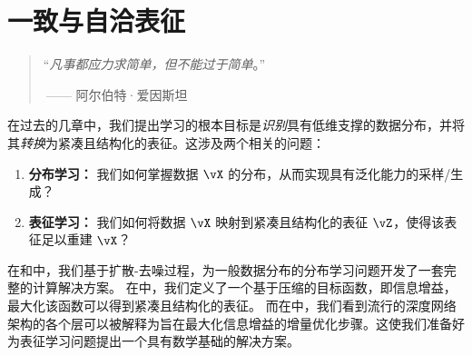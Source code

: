 \documentclass[../../book-main_zh.tex]{subfiles}
\begin{document}
\chapter{一致与自洽表征}
\label{ch:consistent-representations}

\begin{quote}
    \hfill  ``{\em 凡事都应力求简单，但不能过于简单}。''

    $~$\hfill —— 阿尔伯特·爱因斯坦
\end{quote}

\vspace{5mm}

在过去的几章中，我们提出学习的根本目标是\textit{识别}具有低维支撑的数据分布，并将其\textit{转换}为紧凑且结构化的表征。这涉及两个相关的问题：
\begin{enumerate}
    \item \textbf{分布学习：} 我们如何掌握数据 $\vX$ 的分布，从而实现具有泛化能力的采样/生成？
    \item \textbf{表征学习：} 我们如何将数据 $\vX$ 映射到紧凑且结构化的表征 $\vZ$，使得该表征足以重建 $\vX$？
\end{enumerate}
在和中，我们基于扩散-去噪过程，为一般数据分布的分布学习问题开发了一套完整的计算解决方案。 %
在中，我们定义了一个基于压缩的目标函数，即信息增益，最大化该函数可以得到紧凑且结构化的表征。
而在中，我们看到流行的深度网络架构的各个层可以被解释为旨在最大化信息增益的增量优化步骤。这使我们准备好为表征学习问题提出一个具有数学基础的解决方案。

\end{document}
